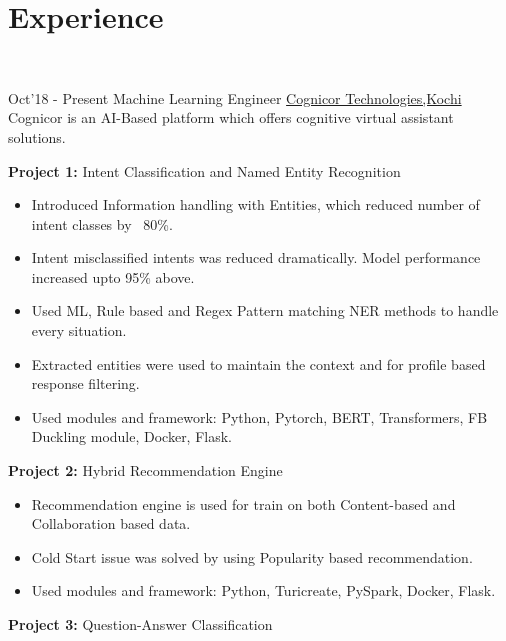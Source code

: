 \documentclass[letterpaper]{twentysecondcv} %
\begin{document}
\section{Experience}\\
    \begin{twenty} %
        \twentyitem
            	{Oct'18 -}
        		{Present}
                {Machine Learning Engineer}
                {\href{https://www.cognicor.com/}{Cognicor Technologies,Kochi}}
                {Cognicor is an AI-Based platform which offers cognitive virtual  assistant solutions.}
                {
                \textbf{Project 1:} Intent Classification and Named Entity Recognition
                    \begin{itemize}
                        \item Introduced Information handling with Entities, which reduced number of intent classes by ~80\%.
                        \item Intent misclassified intents was reduced dramatically. Model performance increased upto 95\% above.
                        \item Used ML, Rule based and Regex Pattern matching NER methods to handle every situation.
                        \item Extracted entities were used to maintain the context and for profile based response filtering.
                        \item Used modules and framework: Python, Pytorch, BERT, Transformers, FB Duckling module, Docker, Flask.
                    \end{itemize}
                \textbf{Project 2:} Hybrid Recommendation Engine 
                    \begin{itemize}
                        \item Recommendation engine is used for train on both Content-based and Collaboration based data.
                        \item Cold Start issue was solved by using Popularity based recommendation.
                        \item Used modules and framework: Python, Turicreate, PySpark, Docker, Flask.
                    \end{itemize}
                \textbf{Project 3:} Question-Answer Classification
                    \begin{itemize}

\end{itemize}}
\end{twenty}
\end{document}
